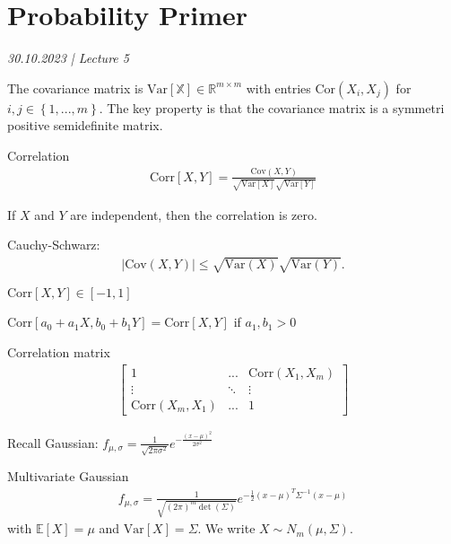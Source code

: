 \section{Probability Primer}

\emph{30.10.2023 | Lecture 5}

The covariance matrix is \( \mathrm{Var}[\mathbb X] \in \mathbb R^{m \times m} \) with entries \( 
  \mathrm{Cor}(X_i, X_j) \) for \( i,j \in \left\{ 1,...,m \right\} \). The key property is that the covariance matrix is a symmetri positive semidefinite matrix.

\begin{defi}
Correlation 
\begin{align*}
  \mathrm{Corr}[X,Y] = \frac{\mathrm{Cov}(X,Y)}{\sqrt{\mathrm{Var}[X]}\sqrt{\mathrm{Var}[Y]}}
\end{align*}
\end{defi}

If \( X \) and \( Y \) are independent, then the correlation is zero.

Cauchy-Schwarz:
\begin{align*}
  |\mathrm{Cov}(X,Y)| \leq \sqrt{\mathrm{Var}(X)}\sqrt{\mathrm{Var}(Y)}.
\end{align*}

\( \mathrm{Corr}[X,Y] \in [-1,1] \)

\( \mathrm{Corr}[a_0 + a_1X, b_0 + b_1Y] = \mathrm{Corr}[X,Y] \) if \( a_1,b_1 > 0 \)

Correlation matrix 
\begin{align*}
  \begin{bmatrix}
    1 & ... & \mathrm{Corr}(X_1, X_m) \\
    \vdots & \ddots & \vdots \\
    \mathrm{Corr}(X_m, X_1) & ... & 1
  \end{bmatrix}
\end{align*}

Recall Gaussian: \( f_{\mu, \sigma} = \frac{1}{\sqrt{2 \pi \sigma^2}}e^{-\frac{(x - \mu)^2}{2\sigma^2}} \)

Multivariate Gaussian 
\begin{align*}
  f_{\mu, \sigma} = \frac{1}{\sqrt{(2 \pi)^m \det(\Sigma)}} e^{-\frac{1}{2} (x - \mu)^T \Sigma^{-1} (x - \mu)}
\end{align*}
with \( \mathbb E[X] = \mu \) and \( \mathrm{Var}[X] = \Sigma \). We write \( X \sim N_{m}(\mu, \Sigma) \).

